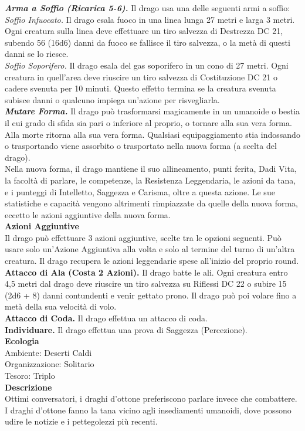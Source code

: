 \begin{multicols}{2}
\emph{\textbf{Arma a Soffio (Ricarica 5-6).}} Il drago usa una delle seguenti armi a soffio:\\
\emph{Soffio Infuocato.} Il drago esala fuoco in una linea lunga 27 metri e larga 3 metri. Ogni creatura sulla linea deve effettuare un tiro salvezza di Destrezza DC 21, subendo 56 (16d6) danni da fuoco se fallisce il tiro salvezza, o la metà di questi danni se lo riesce.\\
\emph{Soffio Soporifero.} Il drago esala del gas soporifero in un cono di 27 metri. Ogni creatura in quell'area deve riuscire un tiro salvezza di Costituzione DC 21 o cadere svenuta per 10 minuti. Questo effetto termina se la creatura svenuta subisce danni o qualcuno impiega un'azione per risvegliarla.\\
\emph{\textbf{Mutare Forma.}} Il drago può trasformarsi magicamente in un umanoide o bestia il cui grado di sfida sia pari o inferiore al proprio, o tornare alla sua vera forma. Alla morte ritorna alla sua vera forma. Qualsiasi equipaggiamento stia indossando o trasportando viene assorbito o trasportato nella nuova forma (a scelta del drago). \\
Nella nuova forma, il drago mantiene il suo allineamento, punti ferita, Dadi Vita, la facoltà di parlare, le competenze, la Resistenza Leggendaria, le azioni da tana, e i punteggi di Intelletto, Saggezza e Carisma, oltre a questa azione. Le sue statistiche e capacità vengono altrimenti rimpiazzate da quelle della nuova forma, eccetto le azioni aggiuntive della nuova forma.\\
\textbf{Azioni Aggiuntive}\\
Il drago può effettuare 3 azioni aggiuntive, scelte tra le opzioni seguenti. Può usare solo un'Azione Aggiuntiva alla volta e solo al termine del turno di un'altra creatura. Il drago recupera le azioni leggendarie spese all'inizio del proprio round.\\
\textbf{Attacco di Ala (Costa 2 Azioni).} Il drago batte le ali. Ogni creatura entro 4,5 metri dal drago deve riuscire un tiro salvezza su Riflessi DC 22 o subire 15 (2d6 + 8) danni contundenti e venir gettato prono. Il drago può poi volare fino a metà della sua velocità di volo.\\
\textbf{Attacco di Coda.} Il drago effettua un attacco di coda.\\
\textbf{Individuare.} Il drago effettua una prova di Saggezza (Percezione).\\
\textbf{Ecologia}\\
Ambiente: Deserti Caldi\\
Organizzazione: Solitario\\
Tesoro: Triplo\\
\textbf{Descrizione}\\
Ottimi conversatori, i draghi d’ottone preferiscono parlare invece che combattere. I draghi d’ottone fanno la tana vicino agli insediamenti umanoidi, dove possono udire le notizie e i pettegolezzi più recenti.\\



\end{multicols}
